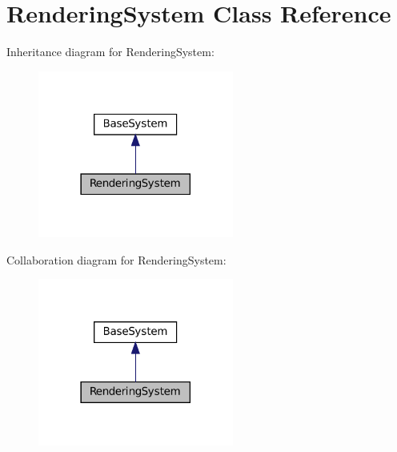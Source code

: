 \hypertarget{classRenderingSystem}{}\section{Rendering\+System Class Reference}
\label{classRenderingSystem}


Inheritance diagram for Rendering\+System\+:\nopagebreak
\begin{figure}[H]
\begin{center}
\leavevmode
\includegraphics[width=182pt]{classRenderingSystem__inherit__graph}
\end{center}
\end{figure}


Collaboration diagram for Rendering\+System\+:\nopagebreak
\begin{figure}[H]
\begin{center}
\leavevmode
\includegraphics[width=182pt]{classRenderingSystem__coll__graph}
\end{center}
\end{figure}
